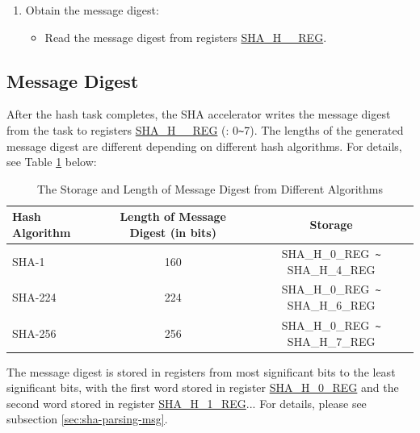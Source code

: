 \documentclass[main\_\_EN.tex]{subfiles}
\begin{document}
\begin{enumerate}
    \item Obtain the message digest:
    \begin{itemize}
        \item Read the message digest from registers \hyperref[regdesc:SHAHNREG]{SHA\_H\_\_REG}.
    \end{itemize}
\end{enumerate}

\subsection{Message Digest}

After the hash task completes, the SHA accelerator writes the message digest from the task to registers \hyperref[regdesc:SHAHNREG]{SHA\_H\_\_REG} (: 0\verb+~+7). The lengths of the generated message digest are different depending on different hash algorithms. For details, see Table \ref{tab:sha-message-digest} below:


\begin{table}[H]
    \centering
    \caption{The Storage and Length of Message Digest from Different Algorithms}
    \label{tab:sha-message-digest}
    \begin{threeparttable}
    \begin{tabular}{ | l | c | c |}
    \hline
        \rowcolor{lightgray}
        \textbf{Hash Algorithm} & \textbf{Length of Message Digest (in bits)} & \textbf{Storage\tnote{1}} \\\hline
        SHA-1 & 160 & SHA\_H\_0\_REG\verb+ ~ +SHA\_H\_4\_REG \\\hline
        SHA-224 & 224 & SHA\_H\_0\_REG\verb+ ~ +SHA\_H\_6\_REG \\\hline  
        SHA-256 & 256 & SHA\_H\_0\_REG\verb+ ~ +SHA\_H\_7\_REG \\\hline
    \end{tabular}

    \begin{tablenotes}
        \item[1] The message digest is stored in registers from most significant bits to the least significant bits, with the first word stored in register \hyperref[regdesc:SHAHNREG]{SHA\_H\_0\_REG} and the second word stored in register \hyperref[regdesc:SHAHNREG]{SHA\_H\_1\_REG}... For details, please see subsection \ref{sec:sha-parsing-msg}.
    \end{tablenotes}

    \end{threeparttable}
\end{table}
\end{document}
